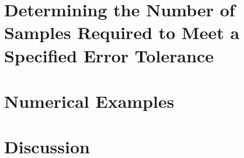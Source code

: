 \documentclass{ws-ijfe}
\begin{document}
\section{Determining the Number of Samples Required to Meet a Specified Error Tolerance}

\section{Numerical Examples}

\section{Discussion}

\newpage











\end{document}
